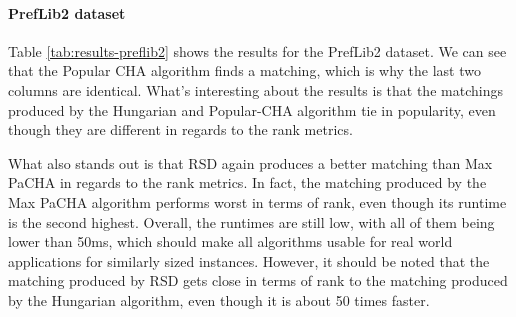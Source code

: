 \paragraph{PrefLib2 dataset}
\begin{table}[h!]
  \centering
  \caption{Summary of the results for PrefLib2}
  \label{tab:results-preflib2}
\end{table}

Table \ref{tab:results-preflib2} shows the results for the PrefLib2 dataset. We can see that the Popular CHA algorithm finds a matching, which is why the last two columns are identical. What's interesting about the results is that the matchings produced by the Hungarian and Popular-CHA algorithm tie in popularity, even though they are different in regards to the rank metrics. 

What also stands out is that RSD again produces a better matching than Max PaCHA in regards to the rank metrics. In fact, the matching produced by the Max PaCHA algorithm performs worst in terms of rank, even though its runtime is the second highest. Overall, the runtimes are still low, with all of them being lower than 50ms, which should make all algorithms usable for real world applications for similarly sized instances. However, it should be noted that the matching produced by RSD gets close in terms of rank to the matching produced by the Hungarian algorithm, even though it is about 50 times faster.

